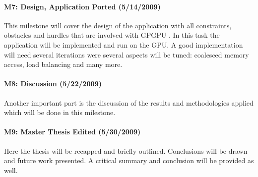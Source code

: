 \paragraph{M7: Design, Application Ported (5/14/2009)} %
\label{par:m7_design_application_ported}
This milestone will cover the design of the application with all constraints,
obstacles and hurdles that are involved with \gls{GPGPU} . In this task the application
will be implemented and run on the \gls{GPU}. A good implementation will need several
iterations were several aspects will be tuned: coalesced memory access, load
balancing and many more.
\paragraph{M8: Discussion (5/22/2009)} %
\label{par:m8_discussion}
Another important part is the discussion of the results and methodologies
applied which will be done in this milestone.

\paragraph{M9: Master Thesis Edited (5/30/2009)} %
\label{par:master_thesis_edited}
Here the thesis will be recapped and briefly outlined. Conclusions will be drawn
and future work presented. A critical summary and conclusion will be provided as
well. %


 



